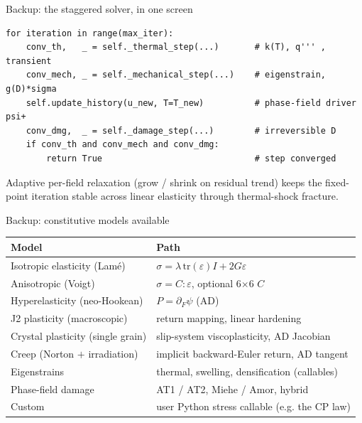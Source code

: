 \documentclass[aspectratio=169,11pt]{beamer}
\begin{document}
\appendix
\begin{frame}[fragile]{Backup: the staggered solver, in one screen}
\begin{lstlisting}
for iteration in range(max_iter):
    conv_th,   _ = self._thermal_step(...)       # k(T), q''' , transient
    conv_mech, _ = self._mechanical_step(...)    # eigenstrain, g(D)*sigma
    self.update_history(u_new, T=T_new)          # phase-field driver psi+
    conv_dmg,  _ = self._damage_step(...)        # irreversible D
    if conv_th and conv_mech and conv_dmg:
        return True                              # step converged
\end{lstlisting}
\vspace{0.3em}
{\scriptsize Adaptive per-field relaxation (grow / shrink on residual trend) keeps the
fixed-point iteration stable across linear elasticity through thermal-shock fracture.}
\end{frame}

\begin{frame}{Backup: constitutive models available}
  \centering
  \begin{tabular}{@{}ll@{}}
    \toprule
    Model & Path \\
    \midrule
    Isotropic elasticity (Lam\'e) & $\sigma = \lambda\,\mathrm{tr}(\varepsilon)I + 2G\varepsilon$ \\
    Anisotropic (Voigt) & $\sigma = C:\varepsilon$, optional 6$\times$6 $C$ \\
    Hyperelasticity (neo-Hookean) & $P = \partial_F \psi$ (AD) \\
    J2 plasticity (macroscopic) & return mapping, linear hardening \\
    Crystal plasticity (single grain) & slip-system viscoplasticity, AD Jacobian \\
    Creep (Norton $+$ irradiation) & implicit backward-Euler return, AD tangent \\
    Eigenstrains & thermal, swelling, densification (callables) \\
    Phase-field damage & AT1 / AT2, Miehe / Amor, hybrid \\
    Custom & user Python stress callable (e.g. the CP law) \\
    \bottomrule
  \end{tabular}
\end{frame}
\end{document}

